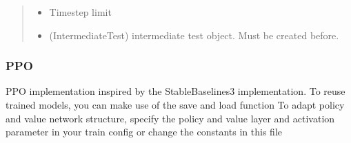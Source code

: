 \documentclass[letterpaper,10pt,english]{sphinxmanual}
\begin{document}
\begin{fulllineitems}
\begin{fulllineitems}
\begin{quote}
\begin{description}
\begin{itemize}
\item {} 
\sphinxAtStartPar
{} \textendash{} Timestep limit

\item {} 
\sphinxAtStartPar
{} \textendash{} (IntermediateTest) intermediate test object. Must be created before.

\end{itemize}

\end{description}\end{quote}

\end{fulllineitems}


\end{fulllineitems}



\subsubsection{PPO}
\label{\detokenize{agents.reinforcement_learning:module-agents.reinforcement_learning.ppo}}\label{\detokenize{agents.reinforcement_learning:ppo}}
\sphinxAtStartPar
PPO implementation inspired by the StableBaselines3 implementation.
To reuse trained models, you can make use of the save and load function
To adapt policy and value network structure, specify the policy and value layer and activation parameter
in your train config or change the constants in this file
\end{document}
